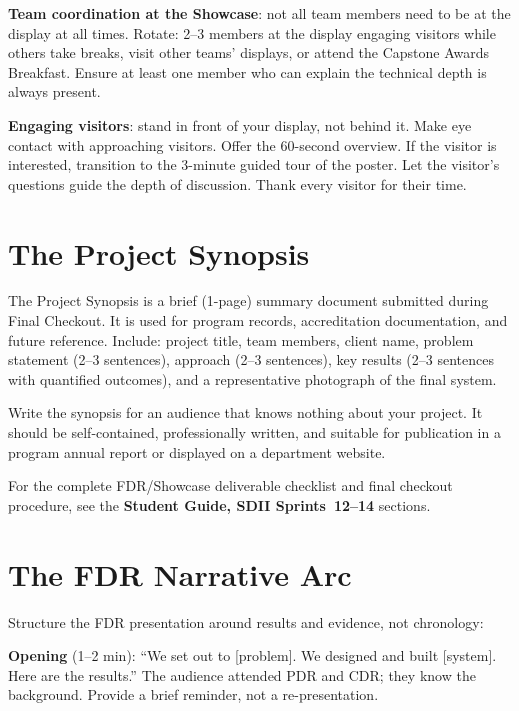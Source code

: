 \textbf{Team coordination at the Showcase}: not all team members need to be at the display at all times. Rotate: 2--3 members at the display engaging visitors while others take breaks, visit other teams' displays, or attend the Capstone Awards Breakfast. Ensure at least one member who can explain the technical depth is always present.

\textbf{Engaging visitors}: stand in front of your display, not behind it. Make eye contact with approaching visitors. Offer the 60-second overview. If the visitor is interested, transition to the 3-minute guided tour of the poster. Let the visitor's questions guide the depth of discussion. Thank every visitor for their time.



\section{The Project Synopsis}
The Project Synopsis is a brief (1-page) summary document submitted during Final Checkout. It is used for program records, accreditation documentation, and future reference. Include: project title, team members, client name, problem statement (2--3 sentences), approach (2--3 sentences), key results (2--3 sentences with quantified outcomes), and a representative photograph of the final system.

Write the synopsis for an audience that knows nothing about your project. It should be self-contained, professionally written, and suitable for publication in a program annual report or displayed on a department website.



\begin{tipbox}
For the complete FDR/Showcase deliverable checklist and final checkout procedure, see the \textbf{Student Guide, SDII Sprints~12--14} sections.
\end{tipbox}

\section{The FDR Narrative Arc}
Structure the FDR presentation around results and evidence, not chronology:

\textbf{Opening} (1--2 min): ``We set out to [problem]. We designed and built [system]. Here are the results.'' The audience attended PDR and CDR; they know the background. Provide a brief reminder, not a re-presentation.

